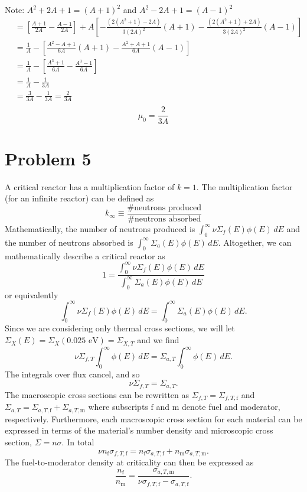 \documentclass{article}
\begin{document}
Note: $A^2+2A+1 = (A+1)^2$ and $A^2-2A+1 = (A-1)^2$
\begin{align*}
			&= \left[ \frac{A+1}{2A} - \frac{A-1}{2A}\right] + A\left[ -\frac{(2(A^2+1)-2A)}{3(2A)^2}(A+1) - \frac{(2(A^2+1)+2A)}{3(2A)^2}(A-1) \right] \\
			&= \frac{1}{A} - \left[ \frac{A^2-A+1}{6A}(A+1) - \frac{A^2+A+1}{6A}(A-1) \right] \\
			&= \frac{1}{A} - \left[ \frac{A^3+1}{6A} - \frac{A^3-1}{6A} \right] \\
			&= \frac{1}{A} - \frac{1}{3A} \\ 
			&= \frac{3}{3A} - \frac{1}{3A} = \frac{2}{3A}\\ 
\end{align*}
$$\boxed{\mu_0 = \frac{2}{3A} }$$ 



\newpage

\section*{Problem 5}

A critical reactor has a multiplication factor of $k=1$. The multiplication factor (for an infinite reactor) can be defined as
$$ k_{\infty} \equiv \frac{\text{\# neutrons produced}}{\text{\# neutrons absorbed}} $$
Mathematically, the number of neutrons produced is $\int_0^{\infty} \nu \Sigma_f(E)\phi(E)\,dE$ and the number of neutrons absorbed is $\int_0^{\infty} \Sigma_a(E)\phi(E)\,dE$. Altogether, we can mathematically describe a critical reactor as 
$$ 1 = \frac{\int_0^{\infty} \nu \Sigma_f(E)\phi(E)\,dE}{\int_0^{\infty} \Sigma_a(E)\phi(E)\,dE} $$
or equivalently
$$ \int_0^{\infty} \nu \Sigma_f(E)\phi(E)\,dE = \int_0^{\infty} \Sigma_a(E)\phi(E)\,dE. $$
Since we are considering only thermal cross sections, we will let $\Sigma_X(E) = \Sigma_X(0.025\text{ eV}) = \Sigma_{X,T}$ and we find
$$ \nu \Sigma_{f,T} \int_0^{\infty} \phi(E)\,dE = \Sigma_{a,T} \int_0^{\infty} \phi(E)\,dE. $$
The integrals over flux cancel, and so
$$ \nu \Sigma_{f,T} = \Sigma_{a,T} .$$
The macroscopic cross sections can be rewritten as $\Sigma_{f,T} = \Sigma_{f,T,\text{f}}$ and $\Sigma_{a,T} = \Sigma_{a,T,\text{f}} + \Sigma_{a,T,\text{m}}$ where subscripts $\text{f}$ and $\text{m}$ denote fuel and moderator, respectively. Furthermore, each macroscopic cross section for each material can be expressed in terms of the material's number density and microscopic cross section, $\Sigma = n\sigma$. In total
$$ \nu n_{\text{f}} \sigma_{f,T,\text{f}} = n_{\text{f}} \sigma_{a,T,\text{f}} + n_{\text{m}} \sigma_{a,T,\text{m}} .$$
The fuel-to-moderator density at criticality can then be expressed as
$$ \frac{n_{\text{f}}}{n_{\text{m}}} = \frac{\sigma_{a,T,\text{m}}}{\nu \sigma_{f,T,\text{f}} - \sigma_{a,T,\text{f}}} .$$
\-\\
\end{document}
